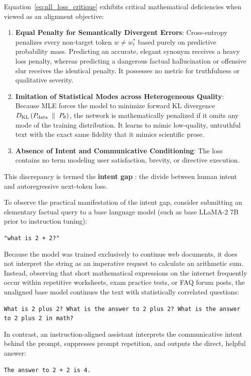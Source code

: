 \documentclass[../../../main.tex]{subfiles}
\begin{document}
Equation~\eqref{eq:nll_loss_critique} exhibits critical mathematical deficiencies when viewed as an alignment objective:
\begin{enumerate}
    \item \textbf{Equal Penalty for Semantically Divergent Errors}: Cross-entropy penalizes every non-target token $w \neq w_t^*$ based purely on predictive probability mass. Predicting an accurate, elegant synonym receives a heavy loss penalty, whereas predicting a dangerous factual hallucination or offensive slur receives the identical penalty. It possesses no metric for truthfulness or qualitative severity.
    \item \textbf{Imitation of Statistical Modes across Heterogeneous Quality}: Because MLE forces the model to minimize forward KL divergence $D_{\mathrm{KL}}\left(P_{\text{data}} \;\parallel\; P_\theta\right)$, the network is mathematically penalized if it omits any mode of the training distribution. It learns to mimic low-quality, untruthful text with the exact same fidelity that it mimics scientific prose.
    \item \textbf{Absence of Intent and Communicative Conditioning}: The loss contains no term modeling user satisfaction, brevity, or directive execution.
\end{enumerate}

This discrepancy is termed the \textbf{intent gap} \citep{ouyang2022}: the divide between human intent and autoregressive next-token loss.

\begin{tcolorbox}[colback=cardBg,colframe=cardLine,arc=2pt,boxrule=0.5pt,title=\textbf{Pedagogical Example: Base Model Prompt Continuation versus Assistant Directive Execution}]
\label{box:base_model_continuation_failure}
To observe the practical manifestation of the intent gap, consider submitting an elementary factual query to a base language model (such as base LLaMA-2 7B prior to instruction tuning):
\begin{center}
\texttt{"what is 2 + 2?"}
\end{center}
Because the model was trained exclusively to continue web documents, it does not interpret the string as an imperative request to calculate an arithmetic sum. Instead, observing that short mathematical expressions on the internet frequently occur within repetitive worksheets, exam practice tests, or FAQ forum posts, the unaligned base model continues the text with statistically correlated questions:
\begin{center}
\texttt{What is 2 plus 2? What is the answer to 2 plus 2? What is the answer to 2 plus 2 in math?}
\end{center}
In contrast, an instruction-aligned assistant interprets the communicative intent behind the prompt, suppresses prompt repetition, and outputs the direct, helpful answer:
\begin{center}
\texttt{The answer to 2 + 2 is 4.}
\end{center}
\end{tcolorbox}
\end{document}
